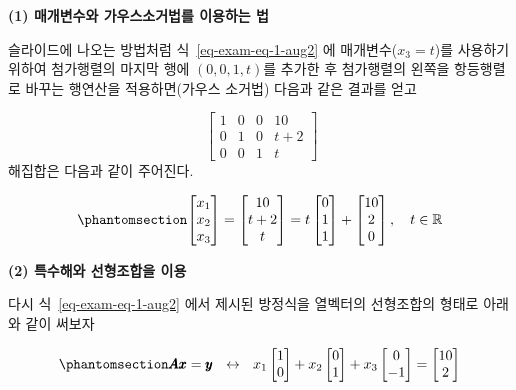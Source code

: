 \documentclass[
  11pt,
  a4paper,
  oneside]{scrbook}
\newcommand{\RR}{\mathbb{R}}
\theoremstyle{definition}
\theoremstyle{definition}
\theoremstyle{plain}
\theoremstyle{remark}
\begin{document}
\textbf{(1) 매개변수와 가우스소거법를 이용하는 법}

슬라이드에 나오는 방법처럼 식~\ref{eq-exam-eq-1-aug2} 에
매개변수(\(x_3=t\))를 사용하기 위하여 첨가행렬의 마지막 행에
\((0,0,1,t)\)를 추가한 후 첨가행렬의 왼쪽을 항등행렬로 바꾸는 행연산을
적용하면(가우스 소거법) 다음과 같은 결과를 얻고

\[
\
\left[\begin{array}{ccc|c}
1 & 0 & 0 & 10\\
0 & 1  & 0 & t+ 2 \\
0 & 0 & 1 & t
\end{array}\right]
\] 해집합은 다음과 같이 주어진다.

\begin{equation}\phantomsection\label{eq-exam-eq-1-sol}{
\begin{bmatrix}
x_1 \\
x_2 \\
x_3 
\end{bmatrix}
= 
\begin{bmatrix}
10 \\
t+2 \\
t 
\end{bmatrix}
=
t
\begin{bmatrix}
0 \\
1 \\
1 
\end{bmatrix}
+ 
\begin{bmatrix}
10 \\
2 \\
0 
\end{bmatrix}, \quad t \in \RR
}\end{equation}

\textbf{(2) 특수해와 선형조합을 이용}

다시 식~\ref{eq-exam-eq-1-aug2} 에서 제시된 방정식을 열벡터의 선형조합의
형태로 아래와 같이 써보자

\begin{equation}\phantomsection\label{eq-exam-eq-linear}{
\pmb A \pmb x = \pmb y
~~\leftrightarrow~~
x_1
\begin{bmatrix}
1  \\
0  
\end{bmatrix}
+
x_2
\begin{bmatrix}
 0  \\
 1   
\end{bmatrix}
+ x_3
\begin{bmatrix}
 0 \\
-1 
\end{bmatrix}
=
\begin{bmatrix}
10 \\
2
\end{bmatrix}
}\end{equation}
\end{document}
